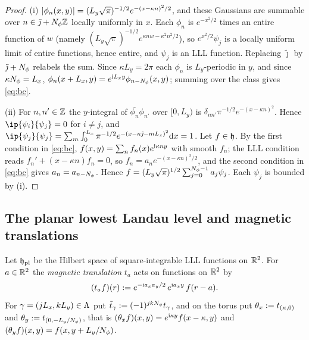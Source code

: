 \begin{proof}
(i) $\lvert\phi_n(x,y)\rvert=(L_y\sqrt\pi)^{-1/2}e^{-(x-\kappa n)^2/2}$, and these Gaussians are summable over
$n\in\tilde\jmath+N_{\phi}\mathbb{Z}$ locally uniformly in $x$. Each $\phi_n$ is $e^{-x^2/2}$ times an entire function of $w$
(namely $(L_y\sqrt\pi)^{-1/2}e^{\kappa nw-\kappa^2n^2/2}$), so $e^{x^2/2}\psi_j$ is a locally uniform limit of
entire functions, hence entire, and $\psi_j$ is an LLL function. Replacing $\tilde\jmath$ by $\tilde\jmath+N_{\phi}$
relabels the sum. Since $\kappa L_y=2\pi$ each $\phi_n$ is $L_y$-periodic in $y$, and since $\kappa N_{\phi}=L_x$,
$\phi_n(x+L_x,y)=e^{\mathrm{i} L_xy}\phi_{n-N_{\phi}}(x,y)$; summing over the class gives \eqref{eq:bc}.

(ii) For $n,n'\in\mathbb{Z}$ the $y$-integral of $\overline{\phi_n}\phi_{n'}$ over $[0,L_y)$ is
$\delta_{nn'}\pi^{-1/2}e^{-(x-\kappa n)^2}$. Hence $\ip{\psi_i}{\psi_j}=0$ for $i\neq j$, and
$\ip{\psi_j}{\psi_j}=\sum_m\int_0^{L_x}\pi^{-1/2}e^{-(x-\kappa\tilde\jmath-mL_x)^2}\dd x=1$. Let $f\in\mathfrak{h}$. By the first
condition in \eqref{eq:bc}, $f(x,y)=\sum_nf_n(x)e^{\mathrm{i}\kappa ny}$ with smooth $f_n$; the LLL condition reads
$f_n'+(x-\kappa n)f_n=0$, so $f_n=a_ne^{-(x-\kappa n)^2/2}$, and the second condition in \eqref{eq:bc} gives
$a_n=a_{n-N_{\phi}}$. Hence $f=(L_y\sqrt\pi)^{1/2}\sum_{j=0}^{N_{\phi}-1}a_j\psi_j$. Each $\psi_j$ is bounded by (i).
\end{proof}

\subsection{The planar lowest Landau level and magnetic translations}

Let $\mathfrak{h}_{\mathrm{pl}}$ be the Hilbert space of square-integrable LLL functions on $\mathbb{R}^2$. For $a\in\mathbb{R}^2$ the \emph{magnetic
translation} $t_a$ acts on functions on $\mathbb{R}^2$ by
\begin{equation}\label{eq:ta}
(t_af)(r):=e^{-\mathrm{i} a_xa_y/2}\,e^{\mathrm{i} a_xy}\,f(r-a).
\end{equation}
For $\gamma=(jL_x,kL_y)\in\Lambda$ put $\tilde t_\gamma:=(-1)^{jkN_{\phi}}t_\gamma$, and on the torus put
$\theta_x:=t_{(\kappa,0)}$ and $\theta_y:=t_{(0,-L_y/N_{\phi})}$, that is $(\theta_x f)(x,y)=e^{\mathrm{i}\kappa y}f(x-\kappa,y)$ and
$(\theta_y f)(x,y)=f(x,y+L_y/N_{\phi})$.

